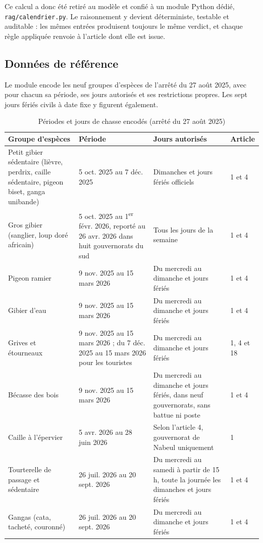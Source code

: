 Ce calcul a donc été retiré au modèle et confié à un module Python dédié,
\texttt{rag/calendrier.py}. Le raisonnement y devient déterministe, testable et
auditable : les mêmes entrées produisent toujours le même verdict, et chaque
règle appliquée renvoie à l'article dont elle est issue.

\subsection{Données de référence}

Le module encode les neuf groupes d'espèces de l'arrêté du 27 août 2025, avec
pour chacun sa période, ses jours autorisés et ses restrictions propres. Les
sept jours fériés civils à date fixe y figurent également.

\begin{table}[h]
\centering
\caption{Périodes et jours de chasse encodés (arrêté du 27 août 2025)}
\label{tab:especes}
\begin{tabular}{|p{3.5cm}|p{3.4cm}|p{4.3cm}|p{1.6cm}|}
\hline
\textbf{Groupe d'espèces} & \textbf{Période} & \textbf{Jours autorisés} &
\textbf{Article} \\
\hline
Petit gibier sédentaire (lièvre, perdrix, caille sédentaire, pigeon biset,
ganga unibande) & 5 oct. 2025 au 7 déc. 2025 & Dimanches et jours fériés
officiels & 1 et 4 \\
\hline
Gros gibier (sanglier, loup doré africain) & 5 oct. 2025 au
1\textsuperscript{er} févr. 2026, reporté au 26 avr. 2026 dans huit
gouvernorats du sud & Tous les jours de la semaine & 1 et 4 \\
\hline
Pigeon ramier & 9 nov. 2025 au 15 mars 2026 & Du mercredi au dimanche et
jours fériés & 1 et 4 \\
\hline
Gibier d'eau & 9 nov. 2025 au 15 mars 2026 & Du mercredi au dimanche et
jours fériés & 1 et 4 \\
\hline
Grives et étourneaux & 9 nov. 2025 au 15 mars 2026 ; du 7 déc. 2025 au
15 mars 2026 pour les touristes & Du mercredi au dimanche et jours fériés &
1, 4 et 18 \\
\hline
Bécasse des bois & 9 nov. 2025 au 15 mars 2026 & Du mercredi au dimanche et
jours fériés, dans neuf gouvernorats, sans battue ni poste & 1 et 4 \\
\hline
Caille à l'épervier & 5 avr. 2026 au 28 juin 2026 & Selon l'article 4,
gouvernorat de Nabeul uniquement & 1 \\
\hline
Tourterelle de passage et sédentaire & 26 juil. 2026 au 20 sept. 2026 & Du
mercredi au samedi à partir de 15 h, toute la journée les dimanches et jours
fériés & 1 et 4 \\
\hline
Gangas (cata, tacheté, couronné) & 26 juil. 2026 au 20 sept. 2026 & Du
mercredi au dimanche et jours fériés & 1 et 4 \\
\hline
\end{tabular}
\end{table}

